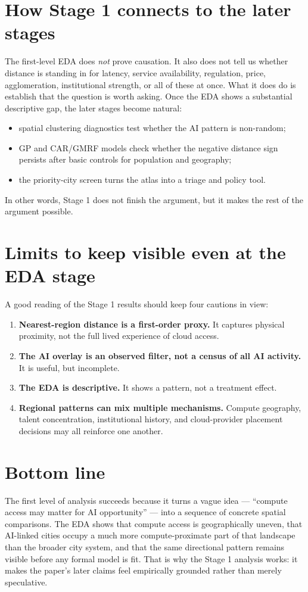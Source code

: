 \documentclass[11pt]{article}
\begin{document}
\section{How Stage 1 connects to the later stages}
The first-level EDA does \emph{not} prove causation. It also does not tell us whether distance is standing in for latency, service availability, regulation, price, agglomeration, institutional strength, or all of these at once. What it does do is establish that the question is worth asking. Once the EDA shows a substantial descriptive gap, the later stages become natural:
\begin{itemize}[leftmargin=*]
    \item spatial clustering diagnostics test whether the AI pattern is non-random;
    \item GP and CAR/GMRF models check whether the negative distance sign persists after basic controls for population and geography;
    \item the priority-city screen turns the atlas into a triage and policy tool.
\end{itemize}

In other words, Stage 1 does not finish the argument, but it makes the rest of the argument possible.

\section{Limits to keep visible even at the EDA stage}
A good reading of the Stage 1 results should keep four cautions in view:
\begin{enumerate}[leftmargin=*]
    \item \textbf{Nearest-region distance is a first-order proxy.} It captures physical proximity, not the full lived experience of cloud access.
    \item \textbf{The AI overlay is an observed filter, not a census of all AI activity.} It is useful, but incomplete.
    \item \textbf{The EDA is descriptive.} It shows a pattern, not a treatment effect.
    \item \textbf{Regional patterns can mix multiple mechanisms.} Compute geography, talent concentration, institutional history, and cloud-provider placement decisions may all reinforce one another.
\end{enumerate}

\section{Bottom line}
The first level of analysis succeeds because it turns a vague idea --- ``compute access may matter for AI opportunity'' --- into a sequence of concrete spatial comparisons. The EDA shows that compute access is geographically uneven, that AI-linked cities occupy a much more compute-proximate part of that landscape than the broader city system, and that the same directional pattern remains visible before any formal model is fit. That is why the Stage 1 analysis works: it makes the paper's later claims feel empirically grounded rather than merely speculative.
\end{document}
